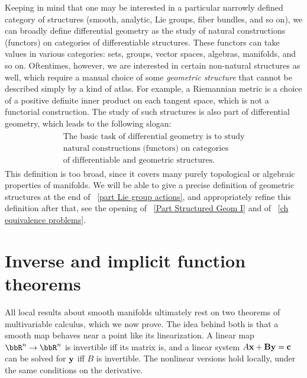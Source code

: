 \begin{intu*}
    Keeping in mind that one may be interested in a particular narrowly defined category of structures (smooth, analytic, Lie groups, fiber bundles, and so on), we can broadly define differential geometry as the study of natural constructions (functors) on categories of differentiable structures. These functors can take values in various categories: sets, groups, vector spaces, algebras, manifolds, and so on. Oftentimes, however, we are interested in certain non-natural structures as well, which require a manual choice of some \emph{geometric structure} that cannot be described simply by a kind of atlas. For example, a Riemannian metric is a choice of a positive definite inner product on each tangent space, which is not a functorial construction. The study of such structures is also part of differential geometry, which leads to the following slogan:
    \begin{gather*}
        \boxed{\begin{array}{c}
        \text{The basic task of differential geometry is to study}\\
        \text{natural constructions (functors) on categories}\\
        \text{of differentiable and geometric structures.}
        \end{array}}
    \end{gather*}
    This definition is too broad, since it covers many purely topological or algebraic properties of manifolds. We will be able to give a precise definition of geometric structures at the end of \Part~\ref{part Lie group actions}, and appropriately refine this definition after that, see the opening of \Part~\ref{Part Structured Geom I} and of \Chap~\ref{ch equivalence problems}.
\end{intu*}


\section{Inverse and implicit function theorems}\label{sec inverse function theorem}

All local results about smooth manifolds ultimately rest on two theorems of multivariable calculus, which we now prove. The idea behind both is that a smooth map behaves near a point like its linearization. A linear map $\bbR^n\to\bbR^n$ is invertible iff its matrix is, and a linear system $A\bf{x}+B\bf{y}=\bf{c}$ can be solved for $\bf{y}$ iff $B$ is invertible. The nonlinear versions hold locally, under the same conditions on the derivative.

